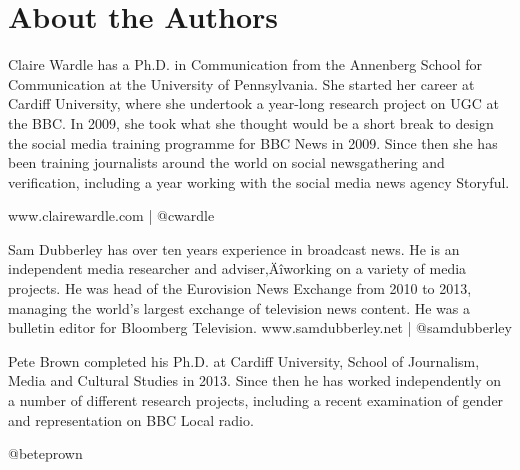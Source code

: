 \documentclass[symmetric, notoc, nobib]{towcenter-book}
\begin{document}
\chapter{About the Authors}
Claire Wardle has a Ph.D. in Communication from the Annenberg School
for Communication at the University of Pennsylvania. She started her career
at Cardiff University, where she undertook a year-long research project on
UGC at the BBC. In 2009, she took what she thought would be a short break
to design the social media training programme for BBC News in 2009. Since
then she has been training journalists around the world on social newsgathering
and verification, including a year working with the social media news
agency Storyful.

www.clairewardle.com | @cwardle


Sam Dubberley has over ten years experience in broadcast news. He is an
independent media researcher and adviser‚Äîworking on a variety of media
projects. He was head of the Eurovision News Exchange from 2010 to 2013,
managing the world's largest exchange of television news content. He was a
bulletin editor for Bloomberg Television.
www.samdubberley.net | @samdubberley


Pete Brown completed his Ph.D. at Cardiff University, School of Journalism,
Media and Cultural Studies in 2013. Since then he has worked independently
on a number of different research projects, including a recent
examination of gender and representation on BBC Local radio.

@beteprown





\backmatter





\end{document}
